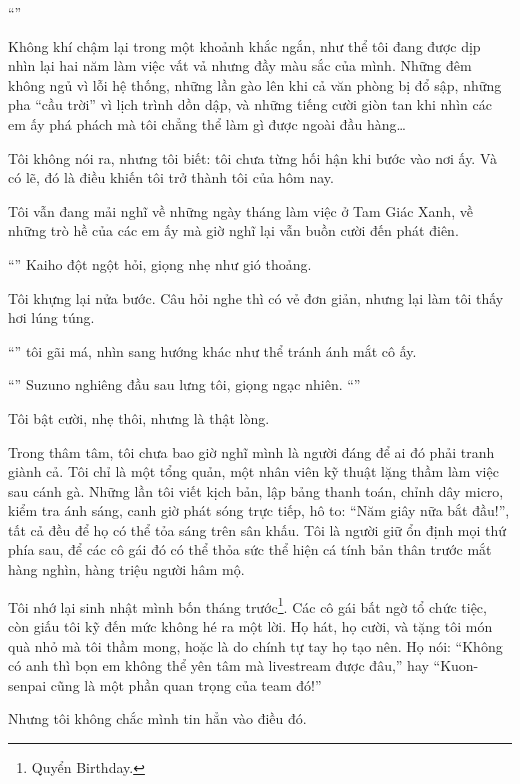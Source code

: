 \documentclass[../main.tex]{subfiles}
\begin{document}
``''

Không khí chậm lại trong một khoảnh khắc ngắn, như thể tôi đang được dịp nhìn lại hai năm làm việc vất vả nhưng đầy màu sắc của mình. Những đêm không ngủ vì lỗi hệ thống, những lần gào lên khi cả văn phòng bị đổ sập, những pha ``cầu trời'' vì lịch trình dồn dập, và những tiếng cười giòn tan khi nhìn các em ấy phá phách mà tôi chẳng thể làm gì được ngoài đầu hàng\dots

Tôi không nói ra, nhưng tôi biết: tôi chưa từng hối hận khi bước vào nơi ấy. Và có lẽ, đó là điều khiến tôi trở thành tôi của hôm nay.

Tôi vẫn đang mải nghĩ về những ngày tháng làm việc ở Tam Giác Xanh, về những trò hề của các em ấy mà giờ nghĩ lại vẫn buồn cười đến phát điên.

``'' Kaiho đột ngột hỏi, giọng nhẹ như gió thoảng.

Tôi khựng lại nửa bước. Câu hỏi nghe thì có vẻ đơn giản, nhưng lại làm tôi thấy hơi lúng túng.

``'' tôi gãi má, nhìn sang hướng khác như thể tránh ánh mắt cô ấy.

``'' Suzuno nghiêng đầu sau lưng tôi, giọng ngạc nhiên. ``''

Tôi bật cười, nhẹ thôi, nhưng là thật lòng.

Trong thâm tâm, tôi chưa bao giờ nghĩ mình là người đáng để ai đó phải tranh giành cả. Tôi chỉ là một tổng quản, một nhân viên kỹ thuật lặng thầm làm việc sau cánh gà. Những lần tôi viết kịch bản, lập bảng thanh toán, chỉnh dây micro, kiểm tra ánh sáng, canh giờ phát sóng trực tiếp, hô to: ``Năm giây nữa bắt đầu!'', tất cả đều để họ có thể tỏa sáng trên sân khấu. Tôi là người giữ ổn định mọi thứ phía sau, để các cô gái đó có thể thỏa sức thể hiện cá tính bản thân trước mắt hàng nghìn, hàng triệu người hâm mộ.

Tôi nhớ lại sinh nhật mình bốn tháng trước\footnote{Quyển Birthday.}. Các cô gái bất ngờ tổ chức tiệc, còn giấu tôi kỹ đến mức không hé ra một lời. Họ hát, họ cười, và tặng tôi món quà nhỏ mà tôi thầm mong, hoặc là do chính tự tay họ tạo nên. Họ nói: ``Không có anh thì bọn em không thể yên tâm mà livestream được đâu,'' hay ``Kuon-senpai cũng là một phần quan trọng của team đó!''

Nhưng tôi không chắc mình tin hẳn vào điều đó.
\end{document}
